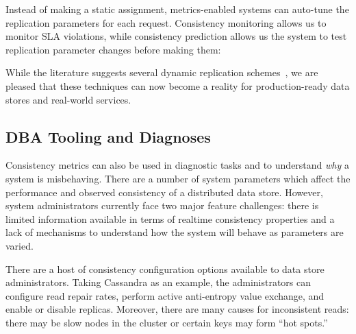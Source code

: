 
Instead of making a static assignment, metrics-enabled systems can
auto-tune the replication parameters for each request. Consistency
monitoring allows us to monitor SLA violations, while consistency
prediction allows us the system to test replication parameter changes
before making them:


While the literature suggests several dynamic replication
schemes~\cite{vahdat-article}, we are pleased that these techniques
can now become a reality for production-ready data stores and
real-world services.

\subsection{DBA Tooling and Diagnoses}
\label{sec:dba}

Consistency metrics can also be used in diagnostic tasks and to
understand \textit{why} a system is misbehaving. There are a number of
system parameters which affect the performance and observed
consistency of a distributed data store. However, system
administrators currently face two major feature challenges: there is
limited information available in terms of realtime consistency
properties and a lack of mechanisms to understand how the system will
behave as parameters are varied.


There are a host of consistency configuration options available to
data store administrators. Taking Cassandra as an example, the
administrators can configure read repair rates, perform active
anti-entropy value exchange, and enable or disable replicas. Moreover,
there are many causes for inconsistent reads: there may be slow nodes
in the cluster or certain keys may form ``hot spots.''


